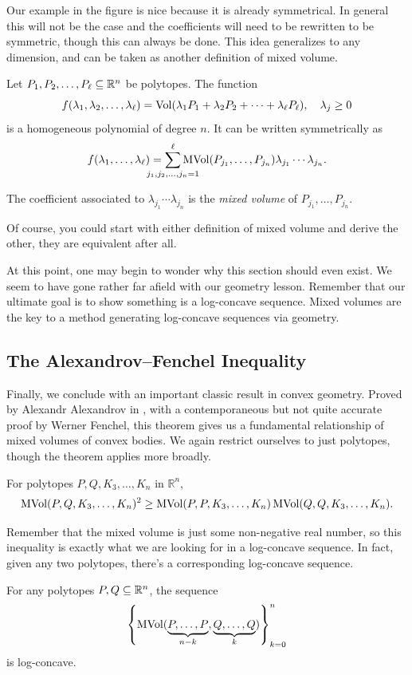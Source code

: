 \documentclass[12pt,oneside]{../../sfsuthesis}
\begin{document}
Our example in the figure is nice because it is already symmetrical.
In general this will not be the case and the coefficients will need to be rewritten to be symmetric, though this can always be done.
This idea generalizes to any dimension, and can be taken as another definition of mixed volume.
\begin{definition}
    Let  \( P_1, P_2, \dots, P_\ell \subseteq \mathbb{R}^n \) be polytopes.
    The function
    \[
        f(\lambda_1, \lambda_2, \dots, \lambda_\ell)  = \operatorname{Vol}(\lambda_1 P_1 + \lambda_2 P_2 + \cdots + \lambda_\ell P_\ell), \quad \lambda_j \geq 0
    \]
    is a homogeneous polynomial of degree \( n \).
    It can be written symmetrically as
    \[
        f(\lambda_1, \dots, \lambda_\ell) = \sum_{\mathclap{j_1, j_2, \dots, j_n = 1}}^{\ell} \MVol(P_{j_1}, \dots, P_{j_n})\lambda_{j_1} \cdots \lambda_{j_n}.
    \]

    The coefficient associated to \( \lambda_{j_1} \cdots \lambda_{j_n} \) is the \emph{mixed volume} of \( P_{j_1}, \dots, P_{j_n} \).

\end{definition}
Of course, you could start with either definition of mixed volume and derive the other, they are equivalent after all.

At this point, one may begin to wonder why this section should even exist.
We seem to have gone rather far afield with our geometry lesson.
Remember that our ultimate goal is to show something is a log-concave sequence.
Mixed volumes are the key to a method generating log-concave sequences via geometry.

\subsection{The Alexandrov–Fenchel Inequality}
Finally, we conclude with an important classic result in convex geometry.
Proved by Alexandr Alexandrov in \cite{aleksandrovZurTheorieGemischter1937}, with a contemporaneous but not quite accurate proof by Werner Fenchel, this theorem gives us a fundamental relationship of mixed volumes of convex bodies.
We again restrict ourselves to just polytopes, though the theorem applies more broadly.
\begin{theorem}\th\label{thm:AFIneq}
    For polytopes \( P, Q, K_3, \dots, K_n \) in \( \mathbb{R}^n \),
    \begin{gather*}
        \operatorname{MVol}(P,Q, K_3, \dots, K_n)^2 \geq \operatorname{MVol}( P, P, K_3, \dots, K_n) \operatorname{MVol}( Q, Q, K_3, \dots, K_n).
    \end{gather*}
\end{theorem}
Remember that the mixed volume is just some non-negative real number, so this inequality is exactly what we are looking for in a log-concave sequence.
In fact, given any two polytopes, there's a corresponding log-concave sequence.
\begin{corollary}\th\label{thm:AFSequence}
    For any polytopes \( P, Q \subseteq \mathbb{R}^n \), the sequence
    \[
        \left\{ \operatorname{MVol}(\underbrace{P,\ldots,P}_{n-k},\underbrace{Q,\ldots,Q}_{k}) \right\}_{k=0}^{n}
    \]
    is log-concave.
\end{corollary}
\end{document}

